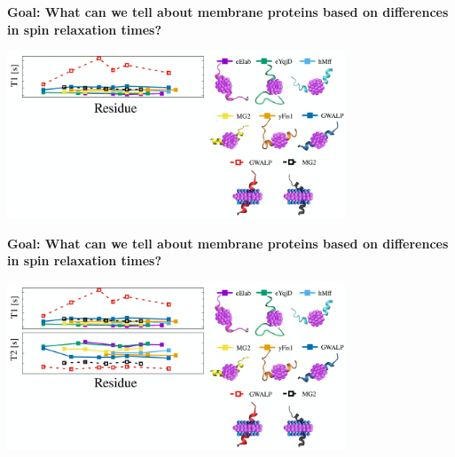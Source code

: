 \documentclass{beamer}
\begin{document}
\addtocounter{framenumber}{-1}
\begin{frame}
\begin{center}
\Large{\centering
\textbf{Goal: What can we tell about membrane proteins based on differences in spin relaxation times?} \\}

\vspace{0.5cm}

\includegraphics[height=5cm]{can_we3.pdf}
\end{center}
\end{frame}

\addtocounter{framenumber}{-1}
\begin{frame}
\begin{center}
\Large{\centering
\textbf{Goal: What can we tell about membrane proteins based on differences in spin relaxation times?} \\}

\vspace{0.5cm}

\includegraphics[height=5cm]{can_we4.pdf}
\end{center}
\end{frame}
\end{document}
